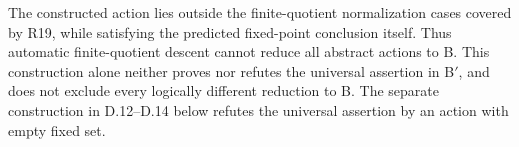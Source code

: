 The constructed action lies outside the finite-quotient
normalization cases covered by R19, while satisfying the
predicted fixed-point conclusion itself. Thus automatic
finite-quotient descent cannot reduce all abstract actions
to B. This construction alone neither proves nor refutes the universal
assertion in B$'$, and does not exclude every logically different
reduction to B. The separate construction in D.12--D.14 below refutes
the universal assertion by an action with empty fixed set.
